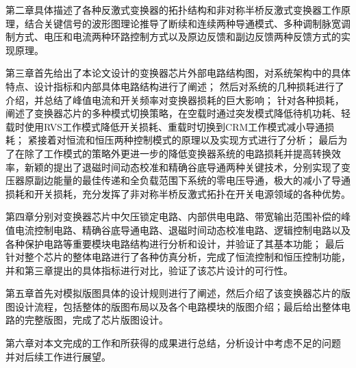第二章具体描述了各种反激式变换器的拓扑结构和非对称半桥反激式变换器工作原理，结合关键信号的波形图理论推导了断续和连续两种导通模式、多种调制脉宽调制方式、电压和电流两种环路控制方式以及原边反馈和副边反馈两种反馈方式的实现原理。 

第三章首先给出了本论文设计的变换器芯片外部电路结构图，对系统架构中的具体特点、设计指标和内部具体电路结构进行了阐述；
然后对系统的几种损耗进行了介绍，并总结了峰值电流和开关频率对变换器损耗的巨大影响；
针对各种损耗，阐述了变换器芯片的多种模式切换策略，在空载时通过突发模式降低待机功耗、轻载时使用RVS工作模式降低开关损耗、重载时切换到CRM工作模式减小导通损耗；
紧接着对恒流和恒压两种控制模式的原理以及实现方式进行了分析；
最后为了在除了工作模式的策略外更进一步的降低变换器系统的电路损耗并提高转换效率，新颖的提出了退磁时间动态校准和精确谷底导通两种关键技术，分别实现了变压器原副边能量的最佳传递和全负载范围下系统的零电压导通，极大的减小了导通损耗和开关损耗，充分发挥了非对称半桥反激式拓扑在开关电源领域的各种优势。

第四章分别对变换器芯片中欠压锁定电路、内部供电电路、带宽输出范围补偿的峰值电流控制电路、精确谷底导通电路、退磁时间动态校准电路、逻辑控制电路以及各种保护电路等重要模块电路结构进行分析和设计，并验证了其基本功能；
最后针对整个芯片的整体电路进行了各种仿真分析，完成了恒流控制和恒压控制功能，并和第三章提出的具体指标进行对比，验证了该芯片设计的可行性。 

第五章首先对模拟版图具体的设计规则进行了阐述，然后介绍了该变换器芯片的版图设计流程，包括整体的版图布局以及各个电路模块的版图介绍；最后给出整体电路的完整版图，完成了芯片版图设计。 

第六章对本文完成的工作和所获得的成果进行总结，分析设计中考虑不足的问题 并对后续工作进行展望。














